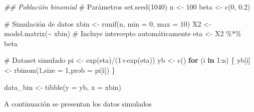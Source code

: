 \documentclass[
  letterpaper,
  DIV=11,
  numbers=noendperiod]{scrartcl}
\newenvironment{Shaded}{\begin{snugshade}}{\end{snugshade}}
\newcommand{\AttributeTok}[1]{\textcolor[rgb]{0.40,0.45,0.13}{#1}}
\newcommand{\CommentTok}[1]{\textcolor[rgb]{0.37,0.37,0.37}{#1}}
\newcommand{\ControlFlowTok}[1]{\textcolor[rgb]{0.00,0.23,0.31}{\textbf{#1}}}
\newcommand{\DecValTok}[1]{\textcolor[rgb]{0.68,0.00,0.00}{#1}}
\newcommand{\DocumentationTok}[1]{\textcolor[rgb]{0.37,0.37,0.37}{\textit{#1}}}
\newcommand{\FloatTok}[1]{\textcolor[rgb]{0.68,0.00,0.00}{#1}}
\newcommand{\FunctionTok}[1]{\textcolor[rgb]{0.28,0.35,0.67}{#1}}
\newcommand{\NormalTok}[1]{\textcolor[rgb]{0.00,0.23,0.31}{#1}}
\newcommand{\OtherTok}[1]{\textcolor[rgb]{0.00,0.23,0.31}{#1}}
\newcommand{\SpecialCharTok}[1]{\textcolor[rgb]{0.37,0.37,0.37}{#1}}
\begin{document}
\begin{Shaded}
\begin{Highlighting}[]
\DocumentationTok{\#\# Población binomial}
\CommentTok{\# Parámetros}
\FunctionTok{set.seed}\NormalTok{(}\DecValTok{1040}\NormalTok{)}
\NormalTok{n }\OtherTok{\textless{}{-}} \DecValTok{100}
\NormalTok{beta }\OtherTok{\textless{}{-}} \FunctionTok{c}\NormalTok{(}\DecValTok{0}\NormalTok{, }\FloatTok{0.2}\NormalTok{)}
\end{Highlighting}
\end{Shaded}

\begin{Shaded}
\begin{Highlighting}[]
\CommentTok{\# Simulación de datos}
\NormalTok{xbin }\OtherTok{\textless{}{-}} \FunctionTok{runif}\NormalTok{(n, }\AttributeTok{min =} \DecValTok{0}\NormalTok{, }\AttributeTok{max =} \DecValTok{10}\NormalTok{)}
\NormalTok{X2 }\OtherTok{\textless{}{-}} \FunctionTok{model.matrix}\NormalTok{(}\SpecialCharTok{\textasciitilde{}}\NormalTok{ xbin)  }\CommentTok{\# Incluye intercepto automáticamente}
\NormalTok{eta }\OtherTok{\textless{}{-}}\NormalTok{ X2 }\SpecialCharTok{\%*\%}\NormalTok{ beta}
\end{Highlighting}
\end{Shaded}

\begin{Shaded}
\begin{Highlighting}[]
\CommentTok{\# Dataset simulado}
\NormalTok{pi }\OtherTok{\textless{}{-}} \FunctionTok{exp}\NormalTok{(eta)}\SpecialCharTok{/}\NormalTok{(}\DecValTok{1}\SpecialCharTok{+}\FunctionTok{exp}\NormalTok{(eta))}
\NormalTok{yb }\OtherTok{\textless{}{-}} \FunctionTok{c}\NormalTok{()}
\ControlFlowTok{for}\NormalTok{ (i }\ControlFlowTok{in} \DecValTok{1}\SpecialCharTok{:}\NormalTok{n) \{}
\NormalTok{  yb[i] }\OtherTok{\textless{}{-}} \FunctionTok{rbinom}\NormalTok{(}\DecValTok{1}\NormalTok{,}\AttributeTok{size =} \DecValTok{1}\NormalTok{,}\AttributeTok{prob =}\NormalTok{ pi[i])}
\NormalTok{\}}

\NormalTok{data\_bin }\OtherTok{\textless{}{-}} \FunctionTok{tibble}\NormalTok{(}\AttributeTok{y =}\NormalTok{ yb, }\AttributeTok{x =}\NormalTok{ xbin)}
\end{Highlighting}
\end{Shaded}

A continuación se presentan los datos simulados
\end{document}
